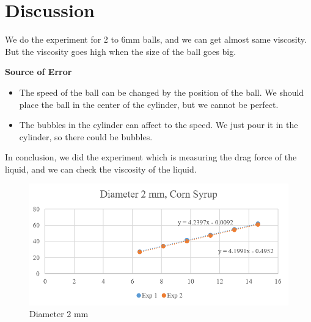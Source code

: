 \documentclass[a4paper]{article}
\begin{document}
\section{Discussion}
We do the experiment for 2 to 6mm balls, and we can get almost same viscosity. But the viscosity goes high when the size of the ball goes big. \newline


\textbf{Source of Error}
\begin{itemize}
    \item{The speed of the ball can be changed by the position of the ball. We should place the ball in the center of the cylinder, but we cannot be perfect. }
    \item{The bubbles in the cylinder can affect to the speed. We just pour it in the cylinder, so there could be bubbles.}
\end{itemize}
In conclusion, we did the experiment which is measuring the drag force of the liquid, and we can check the viscosity of the liquid.
\begin{figure}[htbp]
    \begin{center}
    \includegraphics[scale=1]{exp1}
    \caption{Diameter 2 mm}
    \label{fig:my_label}
    \end{center}
\end{figure}
\end{document}
